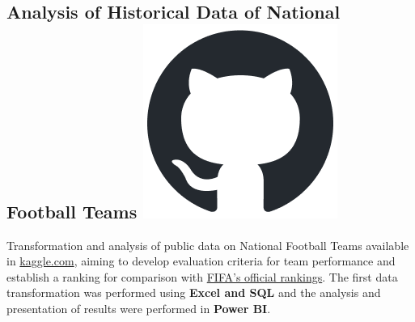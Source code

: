 

\subsection{Analysis of Historical Data of National Football Teams 
\hspace{0.1 cm} \href{https://github.com/juanjogervasio/Data-Analytics-Coderhouse}{\includegraphics[scale=0.2]{github-mark.png}}
}
Transformation and analysis of public data on National Football Teams available in \href{https://www.kaggle.com/datasets/martj42/international-football-results-from-1872-to-2017}{kaggle.com}, aiming to develop evaluation criteria for team performance and establish a ranking for comparison with \href{https://www.kaggle.com/datasets/cashncarry/fifaworldranking}{FIFA's official rankings}. The first data transformation was performed using \textbf{Excel and SQL} and the analysis and presentation of results were performed in \textbf{Power BI}.

\vspace{0.1 cm}

